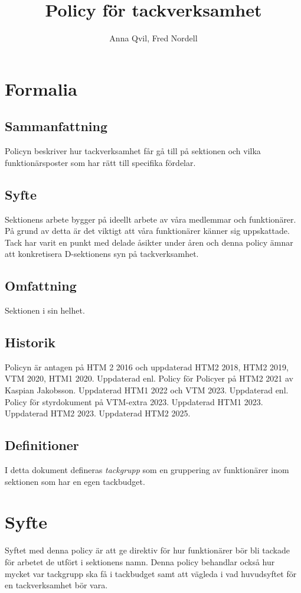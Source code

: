 \documentclass{dsekprotokoll}
\title{Policy för tackverksamhet}
\author{Anna Qvil, Fred Nordell}
\begin{document}
\maketitle
\section{Formalia}
\subsection{Sammanfattning}
Policyn beskriver hur tackverksamhet får gå till på sektionen och vilka funktionärsposter som har rätt till specifika fördelar.

\subsection{Syfte}
Sektionens arbete bygger på ideellt arbete av våra medlemmar och funktionärer. På grund av detta är det viktigt att våra funktionärer känner sig uppskattade. Tack har varit en punkt med delade åsikter under åren och denna policy ämnar att konkretisera D-sektionens syn på tackverksamhet.

\subsection{Omfattning}
Sektionen i sin helhet.

\subsection{Historik}
Policyn är antagen på HTM 2 2016 och uppdaterad HTM2 2018, HTM2 2019, VTM 2020, HTM1 2020.
Uppdaterad enl. Policy för Policyer på HTM2 2021 av Kaspian Jakobsson.
Uppdaterad HTM1 2022 och VTM 2023.
Uppdaterad enl. Policy för styrdokument på VTM-extra 2023.
Uppdaterad HTM1 2023.
Uppdaterad HTM2 2023.
Uppdaterad HTM2 2025.

\subsection{Definitioner}
I detta dokument defineras \textit{tackgrupp} som en gruppering
av funktionärer inom sektionen som har en egen tackbudget.



\section{Syfte}
Syftet med denna policy är att ge direktiv för hur funktionärer bör  bli tackade för arbetet de utfört i sektionens namn. Denna policy behandlar också hur mycket var tackgrupp ska få i tackbudget samt att vägleda i vad huvudsyftet för en tackverksamhet bör vara.
\end{document}
